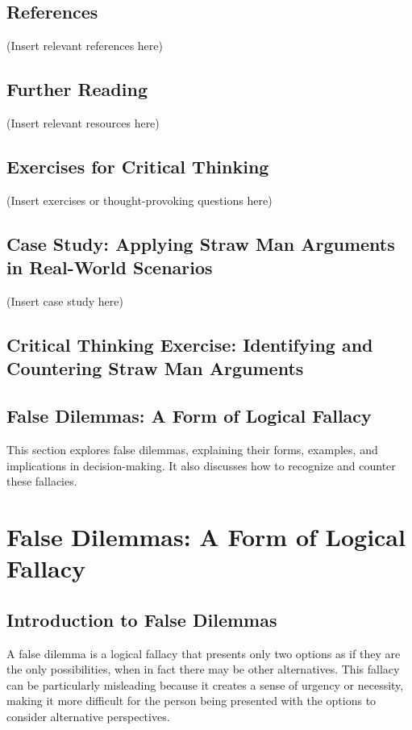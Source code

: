 \documentclass{report}%
\begin{document}
{{{\section*{References}

(Insert relevant references here)

\section*{Further Reading}

(Insert relevant resources here)

\section*{Exercises for Critical Thinking}

(Insert exercises or thought-provoking questions here)

\section*{Case Study: Applying Straw Man Arguments in Real-World Scenarios}

(Insert case study here)

\section*{Critical Thinking Exercise: Identifying and Countering Straw Man Arguments}%
\section{False Dilemmas: A Form of Logical Fallacy}%
This section explores false dilemmas, explaining their forms, examples, and implications in decision-making. It also discusses how to recognize and counter these fallacies.

%
\chapter{False Dilemmas: A Form of Logical Fallacy}

\section{Introduction to False Dilemmas}

A false dilemma is a logical fallacy that presents only two options as if they are the only possibilities, when in fact there may be other alternatives. This fallacy can be particularly misleading because it creates a sense of urgency or necessity, making it more difficult for the person being presented with the options to consider alternative perspectives.

}}}
\end{document}
